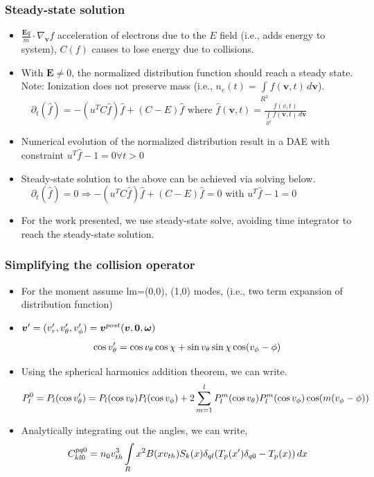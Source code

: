 \documentclass[mathserif, aspectratio=169]{beamer}
\newcommand{\vect}[1]{\boldsymbol{#1}}
\newcommand{\of}[1]{\mleft( #1 \mright)}
\newcommand{\myint}{\int\limits}
\newcommand{\diff}[1]{\, d#1}
\begin{document}
\begin{frame}
	\frametitle{Steady-state solution}
	\begin{itemize}
		\item $\frac{\vect{E} q}{m} \cdot \nabla_{\vect{v}}f$ acceleration of electrons due to the $E$ field (i.e., adds energy to system), $C(f)$ causes to lose energy due to collisions. 
		\item With $\vect{E}\neq 0$, the normalized distribution function should reach a steady state. Note: Ionization does not preserve mass (i.e., $n_e(t)=\myint_{R^3} f(\vect{v},t) \diff{\vect{v}}$).
		$
		\displaystyle
		\quad
		\partial_t (\hat{f}) = -(u^T C \hat{f}) \hat{f} + (C-E)\hat{f} \text{ where } \hat{f}(\vect{v},t) = \frac{f(v,t)}{\myint_{R^3} f(\vect{v},t) \diff{\vect{v}}}
		$
		\item Numerical evolution of the normalized distribution result in a DAE with constraint $u^T \hat{f}-1=0 \forall t>0$
		\item Steady-state solution to the above can be achieved via solving below.  
		$
		\displaystyle
		\quad
		\partial_t (\hat{f}) = 0 \Rightarrow -(u^T C \hat{f}) \hat{f} + (C-E)\hat{f} =0
		$ with $u^T \hat{f}-1=0$
		\item For the work presented, we use steady-state solve, avoiding time integrator to reach the steady-state solution. 
	\end{itemize}
\end{frame}

\begin{frame}
	\frametitle{Simplifying the collision operator}
\begin{itemize}
	\item For the moment assume lm=(0,0), (1,0) modes, (i.e., two term expansion of distribution function)
	\item $\vect{v}^{\prime} = (v_r^\prime, v_\theta^\prime, v_\phi^\prime) =\vect{v}^{post}\of{\vect{v},\vect{0},\vect{\omega}}$
	\begin{align*}
		\cos v_\theta^\prime = \cos v_\theta \cos\chi + \sin v_\theta \sin \chi \cos\of{v_\phi-\phi}
	\end{align*}
	\item Using the spherical harmonics addition theorem, we can write. 
	\begin{align*}
		P_l^{0} = P_l\of{\cos v_\theta^\prime} =  P_l\of{\cos v_\theta} P_l\of{\cos v_\phi} + 2\sum_{m=1}^{l} P_l^{m}\of{\cos v_\theta} P_l^{m}\of{\cos v_\phi} \cos \of{ m (v_\phi-\phi)}
	\end{align*}
	\item Analytically integrating out the angles, we can write,
	\begin{align*}
		C^{pq0}_{kl0}  = n_0 v_{th}^3 \myint_{R} x^2 B(x v_{th}) S_k\of{x} \delta_{ql} \of{T_p\of{x^\prime}\delta_{q0} - T_p\of{x}} \diff{x}  
	\end{align*}
\end{itemize}
\end{frame}
\end{document}
